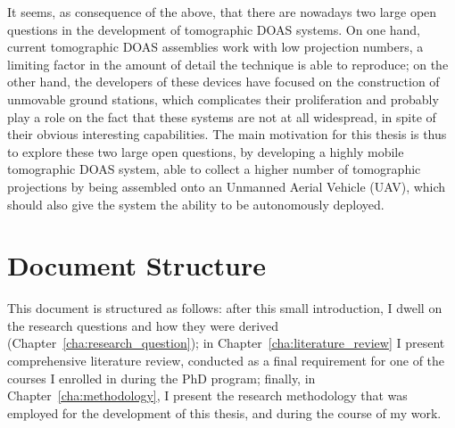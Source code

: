 It seems, as consequence of the above, that there are nowadays two large
open questions in the development of tomographic DOAS systems. On one
hand, current tomographic DOAS assemblies work with low projection
numbers, a limiting factor in the amount of detail the technique is able
to reproduce; on the other hand, the developers of these devices have
focused on the construction of unmovable ground stations, which
complicates their proliferation and probably play a role on the fact
that these systems are not at all widespread, in spite of their obvious
interesting capabilities. The main motivation for this thesis is thus to
explore these two large open questions, by developing a highly mobile
tomographic DOAS system, able to collect a higher number of tomographic
projections by being assembled onto an Unmanned Aerial Vehicle
(\gls{UAV}), which should also give the system the ability to be
autonomously deployed.

\section{Document Structure}%
\label{sec:document_structure}

This document is structured as follows: after this small introduction, I
dwell on the research questions and how they were derived
(Chapter~\ref{cha:research_question}); in
Chapter~\ref{cha:literature_review} I present comprehensive literature
review, conducted as a final requirement for one of the courses I
enrolled in during the PhD program; finally, in Chapter~\ref{cha:methodology}, I
present the research methodology that was employed for the development
of this thesis, and during the course of my work.


